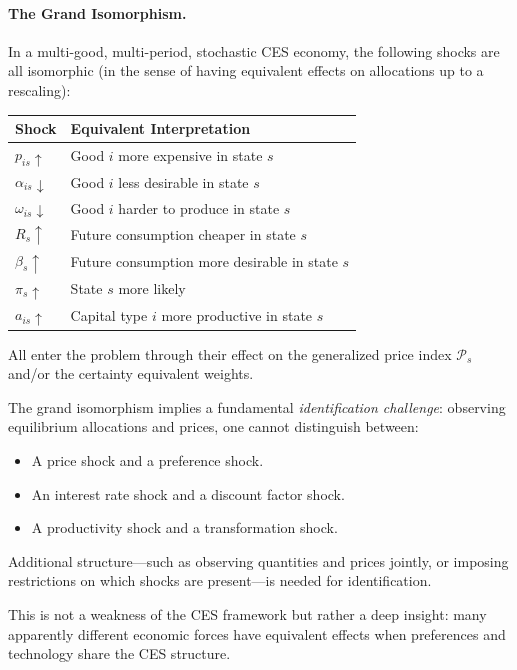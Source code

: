 \paragraph{The Grand Isomorphism.}

\begin{proposition}
\label{prop:ac-iso-grand}
In a multi-good, multi-period, stochastic CES economy, the following shocks are all isomorphic (in the sense of having equivalent effects on allocations up to a rescaling):
\begin{center}
\begin{tabular}{@{}ll@{}}
\toprule
\textbf{Shock} & \textbf{Equivalent Interpretation} \\
\midrule
$p_{is} \uparrow$ & Good $i$ more expensive in state $s$ \\
$\alpha_{is} \downarrow$ & Good $i$ less desirable in state $s$ \\
$\omega_{is} \downarrow$ & Good $i$ harder to produce in state $s$ \\
$R_s \uparrow$ & Future consumption cheaper in state $s$ \\
$\beta_s \uparrow$ & Future consumption more desirable in state $s$ \\
$\pi_s \uparrow$ & State $s$ more likely \\
$a_{is} \uparrow$ & Capital type $i$ more productive in state $s$ \\
\bottomrule
\end{tabular}
\end{center}
All enter the problem through their effect on the generalized price index $\mathcal{P}_s$ and/or the certainty equivalent weights.
\end{proposition}

\begin{calloutimportant}
The grand isomorphism implies a fundamental \emph{identification challenge}: observing equilibrium allocations and prices, one cannot distinguish between:
\begin{itemize}[nosep]
\item A price shock and a preference shock.
\item An interest rate shock and a discount factor shock.
\item A productivity shock and a transformation shock.
\end{itemize}

Additional structure---such as observing quantities and prices jointly, or imposing restrictions on which shocks are present---is needed for identification.

This is not a weakness of the CES framework but rather a deep insight: many apparently different economic forces have equivalent effects when preferences and technology share the CES structure.
\end{calloutimportant}


